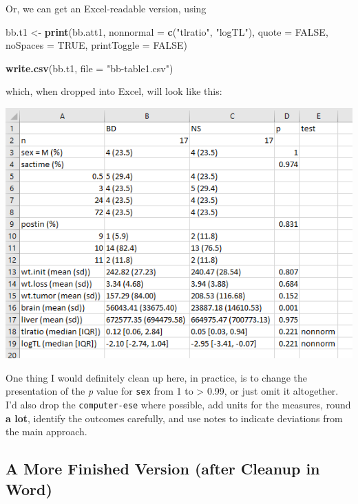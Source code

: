 \documentclass[]{book}
\newenvironment{Shaded}{\begin{snugshade}}{\end{snugshade}}
\newcommand{\KeywordTok}[1]{\textcolor[rgb]{0.13,0.29,0.53}{\textbf{#1}}}
\newcommand{\DataTypeTok}[1]{\textcolor[rgb]{0.13,0.29,0.53}{#1}}
\newcommand{\StringTok}[1]{\textcolor[rgb]{0.31,0.60,0.02}{#1}}
\newcommand{\OtherTok}[1]{\textcolor[rgb]{0.56,0.35,0.01}{#1}}
\newcommand{\NormalTok}[1]{#1}
\theoremstyle{definition}
\theoremstyle{definition}
\theoremstyle{definition}
\theoremstyle{remark}
\begin{document}
Or, we can get an Excel-readable version, using

\begin{Shaded}
\begin{Highlighting}[]
\NormalTok{bb.t1 <-}\StringTok{ }\KeywordTok{print}\NormalTok{(bb.att1, }\DataTypeTok{nonnormal =} \KeywordTok{c}\NormalTok{(}\StringTok{"tlratio"}\NormalTok{, }\StringTok{"logTL"}\NormalTok{), }\DataTypeTok{quote =} \OtherTok{FALSE}\NormalTok{,}
               \DataTypeTok{noSpaces =} \OtherTok{TRUE}\NormalTok{, }\DataTypeTok{printToggle =} \OtherTok{FALSE}\NormalTok{)}

\KeywordTok{write.csv}\NormalTok{(bb.t1, }\DataTypeTok{file =} \StringTok{"bb-table1.csv"}\NormalTok{)}
\end{Highlighting}
\end{Shaded}

which, when dropped into Excel, will look like this:

\includegraphics[width=0.9\linewidth]{images/bb-table1inExcel}

One thing I would definitely clean up here, in practice, is to change
the presentation of the \emph{p} value for \texttt{sex} from 1 to
\textgreater{} 0.99, or just omit it altogether. I'd also drop the
\texttt{computer-ese} where possible, add units for the measures, round
\textbf{a lot}, identify the outcomes carefully, and use notes to
indicate deviations from the main approach.

\subsection{A More Finished Version (after Cleanup in
Word)}\label{a-more-finished-version-after-cleanup-in-word}
\end{document}
